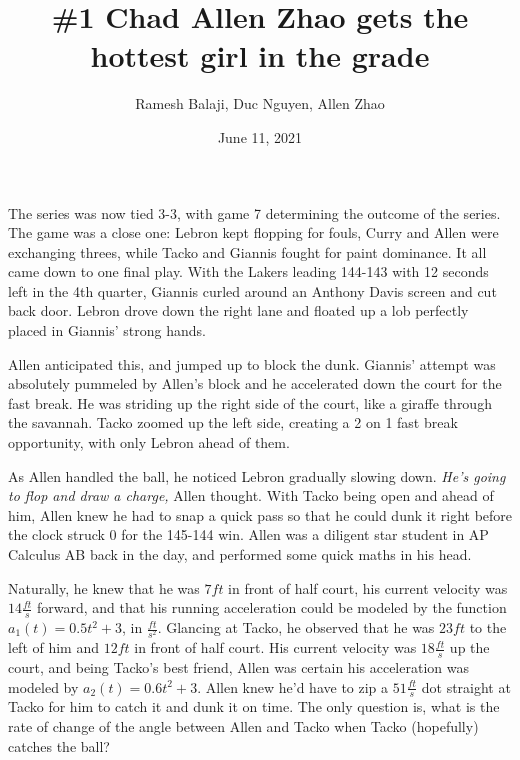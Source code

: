 \documentclass[xcolor={usenames, dvipsnames}]{beamer}
\title{\#1 Chad Allen Zhao gets the hottest girl in the grade}
\author{Ramesh Balaji, Duc Nguyen, Allen Zhao}
\date{June 11, 2021}
\begin{document}
\frame{\titlepage}

\begin{frame}
    The series was now tied 3-3, with game 7 determining the outcome of the series. 
    The game was a close one: Lebron kept flopping for fouls, Curry and Allen were 
    exchanging threes, while Tacko and Giannis fought for paint dominance. It all came 
    down to one final play. With the Lakers leading 144-143 with 12 seconds left in the 
    4th quarter, Giannis curled around an Anthony Davis screen and cut back door.
     Lebron drove down the right lane and floated up a lob perfectly placed in Giannis’ 
     strong hands. 
\end{frame}

\begin{frame}
    Allen anticipated this, and jumped up to block the dunk. Giannis'
    attempt was absolutely pummeled by Allen's block and he accelerated down the
    court for the fast break. He was striding up the right side of the court,
    like a giraffe through the savannah. Tacko zoomed up the left side, creating
    a 2 on 1 fast break opportunity, with only Lebron ahead of them.
\end{frame}

\begin{frame}
    As Allen handled the ball, he noticed Lebron gradually slowing down.
    \emph{He's going to flop and draw a charge,} Allen thought. With Tacko being open
    and ahead of him, Allen knew he had to snap a quick pass so that he could
    dunk it right before the clock struck 0 for the 145-144 win. Allen was a
    diligent star student in AP Calculus AB back in the day, and performed some
    quick maths in his head.
\end{frame}

\begin{frame}
    Naturally, he knew that he was $7 ft$ in front of half court, his
    current velocity was $14 \frac{ft}{s}$ forward, and that his running acceleration
    could be modeled by the function $a_{1}(t) = 0.5t^2 + 3$, in $\frac{ft}{s^2}$. 
    Glancing at Tacko, he observed that he was $23 ft$ to the left of him and $12 ft$ in
    front of half court. His current velocity was $18 \frac{ft}{s}$ up the court, and
    being Tacko's best friend, Allen was certain his acceleration was modeled by
    $a_2(t) = 0.6t^2 + 3$. Allen knew he'd have to zip a $51 \frac{ft}{s}$ dot straight at
    Tacko for him to catch it and dunk it on time. The only question is, what is the rate of 
    change of the angle between Allen and Tacko when Tacko (hopefully) catches the ball?
\end{frame}
\end{document}
